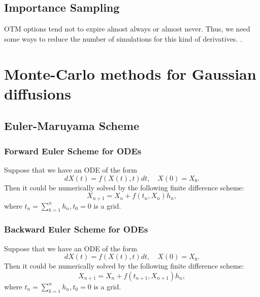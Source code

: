         \subsection{Importance Sampling}
        OTM options tend not to expire almost always or almost never. Thus, we need some ways to reduce the number of simulations for this kind of derivatives.
        \cite{Zhao2013}.

    \section{Monte-Carlo methods for Gaussian diffusions}
    
        \subsection{Euler-Maruyama Scheme}
            \subsubsection{Forward Euler Scheme for ODEs}
                Suppose that we have an ODE of the form
                \begin{equation}
                    dX(t) = f(X(t), t)dt, \quad X(0) = X_0. \label{eq:ode1}
                \end{equation}
                Then it could be numerically solved by the following finite difference scheme:
                \begin{equation}
                    X_{n+1} = X_n + f(t_n, X_n)h_n, \label{Euler:ODE}
                \end{equation}
                where $t_n = \sum_{k=1}^n h_n, t_0 = 0$ is a grid. 

            \subsubsection{Backward Euler Scheme for ODEs}
                Suppose that we have an ODE of the form
                \begin{equation}
                    dX(t) = f(X(t), t)dt, \quad X(0) = X_0. \label{eq:ode2}
                \end{equation}
                Then it could be numerically solved by the following finite difference scheme:
                \begin{equation}
                    X_{n+1} = X_n + f(t_{n+1}, X_{n+1})h_n, \label{Backward:Euler:ODE}
                \end{equation}
                where $t_n = \sum_{k=1}^n h_n, t_0 = 0$ is a grid.

